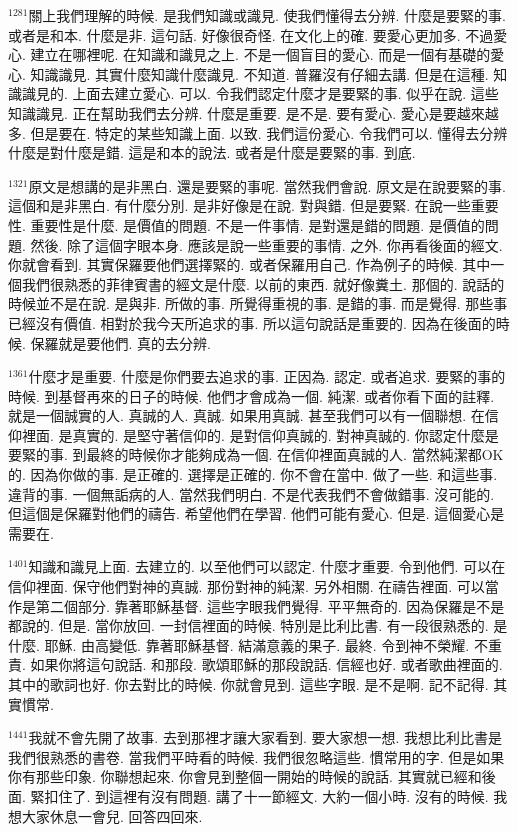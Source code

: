 \documentclass{book}
\begin{document}
$^{1281}$關上我們理解的時候.
是我們知識或識見.
使我們懂得去分辨.
什麼是要緊的事.
或者是和本.
什麼是非.
這句話.
好像很奇怪.
在文化上的確.
要愛心更加多.
不過愛心.
建立在哪裡呢.
在知識和識見之上.
不是一個盲目的愛心.
而是一個有基礎的愛心.
知識識見.
其實什麼知識什麼識見.
不知道.
普羅沒有仔細去講.
但是在這種.
知識識見的.
上面去建立愛心.
可以.
令我們認定什麼才是要緊的事.
似乎在說.
這些知識識見.
正在幫助我們去分辨.
什麼是重要.
是不是.
要有愛心.
愛心是要越來越多.
但是要在.
特定的某些知識上面.
以致.
我們這份愛心.
令我們可以.
懂得去分辨什麼是對什麼是錯.
這是和本的說法.
或者是什麼是要緊的事.
到底.

$^{1321}$原文是想講的是非黑白.
還是要緊的事呢.
當然我們會說.
原文是在說要緊的事.
這個和是非黑白.
有什麼分別.
是非好像是在說.
對與錯.
但是要緊.
在說一些重要性.
重要性是什麼.
是價值的問題.
不是一件事情.
是對還是錯的問題.
是價值的問題.
然後.
除了這個字眼本身.
應該是說一些重要的事情.
之外.
你再看後面的經文.
你就會看到.
其實保羅要他們選擇緊的.
或者保羅用自己.
作為例子的時候.
其中一個我們很熟悉的菲律賓書的經文是什麼.
以前的東西.
就好像糞土.
那個的.
說話的時候並不是在說.
是與非.
所做的事.
所覺得重視的事.
是錯的事.
而是覺得.
那些事已經沒有價值.
相對於我今天所追求的事.
所以這句說話是重要的.
因為在後面的時候.
保羅就是要他們.
真的去分辨.

$^{1361}$什麼才是重要.
什麼是你們要去追求的事.
正因為.
認定.
或者追求.
要緊的事的時候.
到基督再來的日子的時候.
他們才會成為一個.
純潔.
或者你看下面的註釋.
就是一個誠實的人.
真誠的人.
真誠.
如果用真誠.
甚至我們可以有一個聯想.
在信仰裡面.
是真實的.
是堅守著信仰的.
是對信仰真誠的.
對神真誠的.
你認定什麼是要緊的事.
到最終的時候你才能夠成為一個.
在信仰裡面真誠的人.
當然純潔都OK的.
因為你做的事.
是正確的.
選擇是正確的.
你不會在當中.
做了一些.
和這些事.
違背的事.
一個無詬病的人.
當然我們明白.
不是代表我們不會做錯事.
沒可能的.
但這個是保羅對他們的禱告.
希望他們在學習.
他們可能有愛心.
但是.
這個愛心是需要在.

$^{1401}$知識和識見上面.
去建立的.
以至他們可以認定.
什麼才重要.
令到他們.
可以在信仰裡面.
保守他們對神的真誠.
那份對神的純潔.
另外相關.
在禱告裡面.
可以當作是第二個部分.
靠著耶穌基督.
這些字眼我們覺得.
平平無奇的.
因為保羅是不是都說的.
但是.
當你放回.
一封信裡面的時候.
特別是比利比書.
有一段很熟悉的.
是什麼.
耶穌.
由高變低.
靠著耶穌基督.
結滿意義的果子.
最終.
令到神不榮耀.
不重責.
如果你將這句說話.
和那段.
歌頌耶穌的那段說話.
信經也好.
或者歌曲裡面的.
其中的歌詞也好.
你去對比的時候.
你就會見到.
這些字眼.
是不是啊.
記不記得.
其實慣常.

$^{1441}$我就不會先開了故事.
去到那裡才讓大家看到.
要大家想一想.
我想比利比書是我們很熟悉的書卷.
當我們平時看的時候.
我們很忽略這些.
慣常用的字.
但是如果你有那些印象.
你聯想起來.
你會見到整個一開始的時候的說話.
其實就已經和後面.
緊扣住了.
到這裡有沒有問題.
講了十一節經文.
大約一個小時.
沒有的時候.
我想大家休息一會兒.
回答四回來.
\newpage
\end{document}
